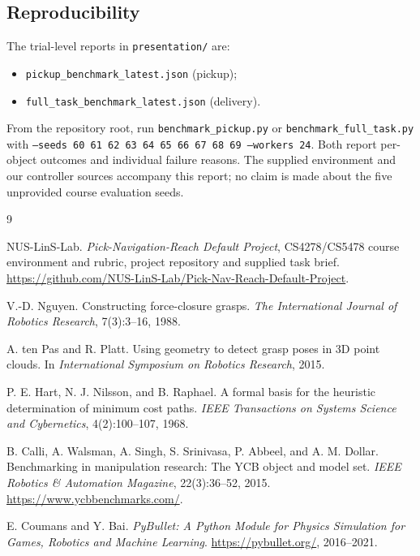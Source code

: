 \documentclass[10pt,a4paper]{article}
\begin{document}
\subsection*{Reproducibility}
The trial-level reports in \texttt{presentation/} are:
\begin{itemize}
\setlength{\itemsep}{0pt}
\item \texttt{pickup\_benchmark\_latest.json} (pickup);
\item \texttt{full\_task\_benchmark\_latest.json} (delivery).
\end{itemize}
From the repository root, run
\texttt{benchmark\_pickup.py} or \texttt{benchmark\_full\_task.py}
with \texttt{--seeds 60 61 62 63 64 65 66 67 68 69 --workers 24}.
Both report per-object outcomes and individual failure reasons. The supplied
environment and our controller sources accompany this report; no claim is
made about the five unprovided course evaluation seeds.

\clearpage
\begin{thebibliography}{9}\small\raggedright
{} NUS-LinS-Lab. \emph{Pick-Navigation-Reach Default Project},
CS4278/CS5478 course environment and rubric, project repository and supplied
task brief. \url{https://github.com/NUS-LinS-Lab/Pick-Nav-Reach-Default-Project}.

 V.-D. Nguyen. Constructing force-closure grasps.
\emph{The International Journal of Robotics Research}, 7(3):3--16, 1988.

 A. ten Pas and R. Platt. Using geometry to detect grasp
poses in 3D point clouds. In \emph{International Symposium on Robotics
Research}, 2015.

 P. E. Hart, N. J. Nilsson, and B. Raphael. A formal basis
for the heuristic determination of minimum cost paths. \emph{IEEE
Transactions on Systems Science and Cybernetics}, 4(2):100--107, 1968.

 B. Calli, A. Walsman, A. Singh, S. Srinivasa, P. Abbeel,
and A. M. Dollar. Benchmarking in manipulation research: The YCB object
and model set. \emph{IEEE Robotics \& Automation Magazine}, 22(3):36--52,
2015. \url{https://www.ycbbenchmarks.com/}.

 E. Coumans and Y. Bai. \emph{PyBullet: A Python Module for
Physics Simulation for Games, Robotics and Machine Learning}.
\url{https://pybullet.org/}, 2016--2021.
\end{thebibliography}
\end{document}
